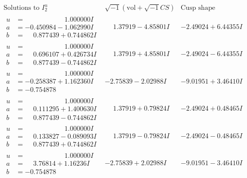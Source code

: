 \documentclass[1p]{elsarticle_modified}
\theoremstyle{definition}
\newcommand{\I}{\sqrt{-1}}
\begin{document}
$$\begin{array}{c|c|c}  
\text{Solutions to }I^u_{2}& \I (\text{vol} + \sqrt{-1}CS) & \text{Cusp shape}\\
 \hline 
\begin{aligned}
u &= \phantom{-0.000000 -}1.000000 I \\
a &= -0.450984 - 1.062990 I \\
b &= \phantom{-}0.877439 + 0.744862 I\end{aligned}
 & \phantom{-}1.37919 - 4.85801 I & -2.49024 + 6.44355 I \\ \hline\begin{aligned}
u &= \phantom{-0.000000 -}1.000000 I \\
a &= \phantom{-}0.696107 + 0.426734 I \\
b &= \phantom{-}0.877439 - 0.744862 I\end{aligned}
 & \phantom{-}1.37919 + 4.85801 I & -2.49024 - 6.44355 I \\ \hline\begin{aligned}
u &= \phantom{-0.000000 -}1.000000 I \\
a &= -0.258387 + 1.162360 I \\
b &= -0.754878\phantom{ +0.000000I}\end{aligned}
 & -2.75839 - 2.02988 I & -9.01951 + 3.46410 I \\ \hline\begin{aligned}
u &= \phantom{-0.000000 -}1.000000 I \\
a &= \phantom{-}0.111295 + 1.400630 I \\
b &= \phantom{-}0.877439 - 0.744862 I\end{aligned}
 & \phantom{-}1.37919 + 0.79824 I & -2.49024 + 0.48465 I \\ \hline\begin{aligned}
u &= \phantom{-0.000000 -}1.000000 I \\
a &= \phantom{-}0.133827 - 0.089093 I \\
b &= \phantom{-}0.877439 + 0.744862 I\end{aligned}
 & \phantom{-}1.37919 - 0.79824 I & -2.49024 - 0.48465 I \\ \hline\begin{aligned}
u &= \phantom{-0.000000 -}1.000000 I \\
a &= \phantom{-}3.76814 + 1.16236 I \\
b &= -0.754878\phantom{ +0.000000I}\end{aligned}
 & -2.75839 + 2.02988 I & -9.01951 - 3.46410 I \\ \hline\begin{aligned}

\end{aligned}
\end{array}$$
\end{document}
